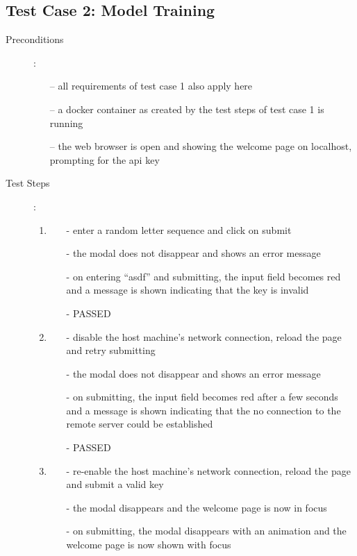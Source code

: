 \subsection{Test Case 2: Model Training}
\begin{description}
	\item[Preconditions]: 
	\begin{itemize}
		\item [--] all requirements of test case 1 also apply here
		\item [--] a docker container as created by the test steps of test case 1 is running
		\item [--] the web browser is open and showing the welcome page on localhost, prompting for the api key
	\end{itemize}
	\item[Test Steps]: 
	\begin{enumerate}
		\item  
		\begin{itemize}
			\item [-] enter a random letter sequence and click on submit
			\item [-] the modal does not disappear and shows an error message
			\item [-] on entering \enquote{asdf} and submitting, the input field becomes red and a message is shown indicating that the key is invalid
			\item [-] PASSED
		\end{itemize}
		\item  
		\begin{itemize}
			\item [-] disable the host machine's network connection, reload the page and retry submitting
			\item [-] the modal does not disappear and shows an error message
			\item [-] on submitting, the input field becomes red after a few seconds and a message is shown indicating that the no connection to the remote server could be established
			\item [-] PASSED
		\end{itemize}
		\item
		\begin{itemize}
			\item [-] re-enable the host machine's network connection, reload the page and submit a valid key
			\item [-] the modal disappears and the welcome page is now in focus
			\item [-] on submitting, the modal disappears with an animation and the welcome page is now shown with focus

\end{itemize}
\end{enumerate}
\end{description}
